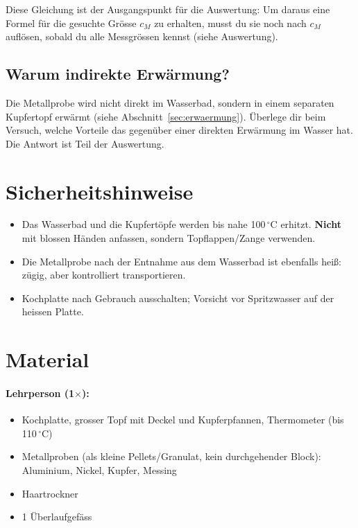 \documentclass[11pt,a4paper]{article}
\newcommand{\celsius}{\ensuremath{^{\circ}\mathrm{C}}}
\newcommand{\SI}[2]{#1\,#2}
\begin{document}
Diese Gleichung ist der Ausgangspunkt f\"ur die Auswertung: Um daraus eine Formel f\"ur die gesuchte Gr\"osse $c_M$ zu erhalten, musst du sie noch nach $c_M$ aufl\"osen, sobald du alle Messgr\"ossen kennst (siehe Auswertung).

\subsection{Warum indirekte Erw\"armung?}
Die Metallprobe wird nicht direkt im Wasserbad, sondern in einem separaten Kupfertopf erw\"armt (siehe Abschnitt~\ref{sec:erwaermung}). \"Uberlege dir beim Versuch, welche Vorteile das gegen\"uber einer direkten Erw\"armung im Wasser hat. Die Antwort ist Teil der Auswertung.

\section{Sicherheitshinweise}
\begin{itemize}
  \item Das Wasserbad und die Kupfert\"opfe werden bis nahe \SI{100}{\celsius} erhitzt. \textbf{Nicht} mit blossen H\"anden anfassen, sondern Topflappen/Zange verwenden.
  \item Die Metallprobe nach der Entnahme aus dem Wasserbad ist ebenfalls hei\ss{}: zügig, aber kontrolliert transportieren.
  \item Kochplatte nach Gebrauch ausschalten; Vorsicht vor Spritzwasser auf der heissen Platte.
\end{itemize}

\section{Material}

\paragraph{Lehrperson (1$\times$):}
\begin{itemize}
  \item Kochplatte, grosser Topf mit Deckel und Kupferpfannen, Thermometer (bis \SI{110}{\celsius})
  \item Metallproben (als kleine Pellets/Granulat, kein durchgehender Block): Aluminium, Nickel, Kupfer, Messing
  \item Haartrockner
  \item 1 \"Uberlaufgef\"ass
\end{itemize}
\end{document}
